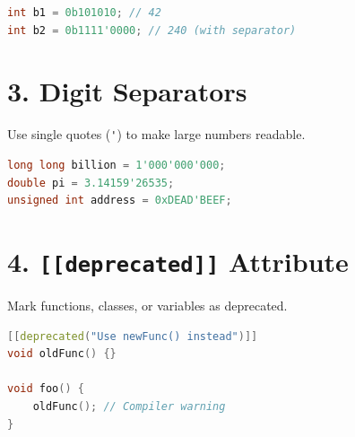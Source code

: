 \begin{lstlisting}[language={C++}]
int b1 = 0b101010; // 42
int b2 = 0b1111'0000; // 240 (with separator)
\end{lstlisting}

\hypertarget{digit-separators}{%
\section{3. Digit Separators}\label{digit-separators}}

Use single quotes (\passthrough{\lstinline!'!}) to make large numbers
readable.

\begin{lstlisting}[language={C++}]
long long billion = 1'000'000'000;
double pi = 3.14159'26535;
unsigned int address = 0xDEAD'BEEF;
\end{lstlisting}

\hypertarget{deprecated-attribute}{%
\section{\texorpdfstring{4. \texttt{{[}{[}deprecated{]}{]}}
Attribute}{4. {[}{[}deprecated{]}{]} Attribute}}\label{deprecated-attribute}}

Mark functions, classes, or variables as deprecated.

\begin{lstlisting}[language={C++}]
[[deprecated("Use newFunc() instead")]]
void oldFunc() {}

void foo() {
    oldFunc(); // Compiler warning
}
\end{lstlisting}
